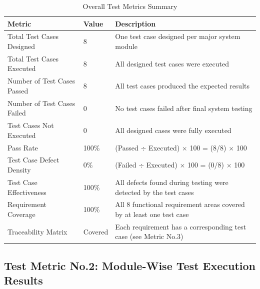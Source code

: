 \documentclass{FastFyp}
\begin{document}
\begin{table}[H]
\footnotesize
\centering
\caption{Overall Test Metrics Summary}
\label{tab:metric01}
\begin{tabular}{|p{5cm}|p{2.5cm}|p{5.5cm}|}
\hline
\textbf{Metric} & \textbf{Value} & \textbf{Description} \\ \hline
Total Test Cases Designed & 8 & One test case designed per major system module \\ \hline
Total Test Cases Executed & 8 & All designed test cases were executed \\ \hline
Number of Test Cases Passed & 8 & All test cases produced the expected results \\ \hline
Number of Test Cases Failed & 0 & No test cases failed after final system testing \\ \hline
Test Cases Not Executed & 0 & All designed cases were fully executed \\ \hline
Pass Rate & 100\% & (Passed $\div$ Executed) $\times$ 100 = (8/8) $\times$ 100 \\ \hline
Test Case Defect Density & 0\% & (Failed $\div$ Executed) $\times$ 100 = (0/8) $\times$ 100 \\ \hline
Test Case Effectiveness & 100\% & All defects found during testing were detected by the test cases \\ \hline
Requirement Coverage & 100\% & All 8 functional requirement areas covered by at least one test case \\ \hline
Traceability Matrix & Covered & Each requirement has a corresponding test case (see Metric No.3) \\ \hline
\end{tabular}
\end{table}

\subsection{Test Metric No.2: Module-Wise Test Execution Results}
\end{document}
